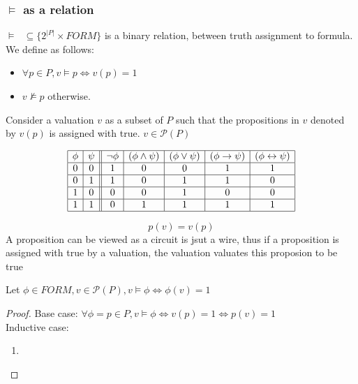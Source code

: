 \documentclass{article}
\newtheorem{definition}[theorem]{Definition}
\let\olddefinition\definition
\let\endolddefinition\enddefinition
\renewenvironment{definition}
  {\begin{tcolorbox}[
      colback=red!10,
      colframe=red!50!black,
      boxrule=0.6pt,
      arc=2pt,
      left=6pt,right=6pt,top=4pt,bottom=4pt,
      breakable
    ]\olddefinition}
  {\endolddefinition\end{tcolorbox}}
\newtheorem{lemma}[theorem]{Lemma}
\let\oldlemma\lemma
\let\endoldlemma\endlemma
\renewenvironment{lemma}
  {\begin{tcolorbox}[
      colback=green!8,
      colframe=green!50!black,
      boxrule=0.6pt,
      arc=2pt,
      left=6pt,right=6pt,top=4pt,bottom=4pt
    ]\oldlemma}
  {\endoldlemma\end{tcolorbox}}
\begin{document}
\subsubsection{$\models$ as a relation}
\begin{definition}
    $\models \text{ } \subseteq \{2^{|P|} \times FORM\}$ is a binary relation, between truth assignment to formula. 
    We define as follows: 
    \begin{itemize}
        \item $\forall p \in P, v \models p \iff v(p) = 1$
        \item $v \not\models p$ otherwise.
    \end{itemize}
    Consider a valuation $v$ as a subset of $P$ such that the propositions in $v$ denoted by $v(p)$ is assigned with true. $v \in \mathscr{P}(P)$
\end{definition}
$$
\begin{array}{|c|c||c|c|c|c|c|}
\hline
\phi & \psi & \neg \phi & (\phi \wedge \psi) & (\phi \vee \psi) & (\phi \to \psi) & (\phi \leftrightarrow \psi) \\
\hline
0 & 0 & 1 & 0 & 0 & 1 & 1 \\
\hline
0 & 1 & 1 & 0 & 1 & 1 & 0 \\
\hline
1 & 0 & 0 & 0 & 1 & 0 & 0 \\
\hline
1 & 1 & 0 & 1 & 1 & 1 & 1 \\
\hline
\end{array}
$$
\begin{definition}
    \[p(v) = v(p)\]
    A proposition can be viewed as a circuit is jsut a wire, thus if a proposition is assigned with true by a valuation, the valuation valuates this proposion to be true
\end{definition}
\begin{lemma}
    Let $\phi \in FORM, v \in \mathscr{P}(P), v \models \phi \iff \phi(v) = 1$
\end{lemma}
\begin{proof}
    Base case: $\forall \phi = p \in P, v\models \phi \iff v(p) = 1 \iff p(v) = 1$\\
    Inductive case: 
    \begin{enumerate}
        \item 
    \end{enumerate}
\end{proof}
\end{document}
